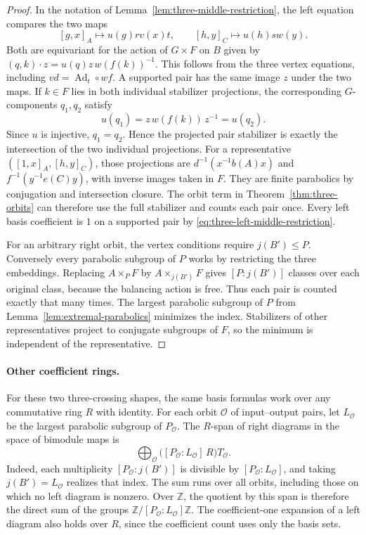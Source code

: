\documentclass[11pt,a4paper]{article}
\numberwithin{equation}{section}
\theoremstyle{definition}
\begin{document}
\begin{proof}
In the notation of Lemma~\ref{lem:three-middle-restriction}, the
left equation compares the two maps
\[
 [g,x]_A\longmapsto u(g)r v(x)t,\qquad
 [h,y]_C\longmapsto u(h)s w(y).
\]
Both are equivariant for the action of \(G\times F\) on \(B\)
given by \((q,k)\cdot z=u(q)z\,w(f(k))^{-1}\). This follows from
the three vertex equations, including
\(vd=\operatorname{Ad}_t\circ wf\).
A supported pair has the same image \(z\) under the two maps.
If \(k\in F\) lies in both individual stabilizer projections,
the corresponding \(G\)-components \(q_1,q_2\) satisfy
\[
 u(q_1)=z\,w(f(k))\,z^{-1}=u(q_2).
\]
Since \(u\) is injective, \(q_1=q_2\). Hence the projected pair
stabilizer is exactly the intersection of the two individual
projections. For a representative \(([1,x]_A,[h,y]_C)\), those
projections are \(d^{-1}(x^{-1}b(A)x)\) and
\(f^{-1}(y^{-1}e(C)y)\), with inverse images taken in \(F\).
They are finite parabolics by conjugation and intersection
closure. The orbit term in Theorem~\ref{thm:three-orbits} can
therefore use the full stabilizer and counts each pair once.
Every left basis coefficient is \(1\) on a supported pair by
\eqref{eq:three-left-middle-restriction}.

For an arbitrary right orbit, the vertex conditions require
\(j(B')\le P\). Conversely every parabolic subgroup of \(P\)
works by restricting the three embeddings. Replacing
\(A\times_P F\) by \(A\times_{j(B')}F\) gives
\([P:j(B')]\) classes over each original class, because the
balancing action is free. Thus each pair is counted exactly
that many times. The largest parabolic subgroup of \(P\) from
Lemma~\ref{lem:extremal-parabolics} minimizes the index. Stabilizers of other representatives
project to conjugate subgroups of \(F\), so the minimum is
independent of the representative.
\end{proof}

\paragraph{Other coefficient rings.}
For these two three-crossing shapes, the same basis formulas work
over any commutative ring \(R\) with identity. For each orbit
\(\mathcal O\) of input--output pairs, let \(L_{\mathcal O}\) be the
largest parabolic subgroup of \(P_{\mathcal O}\). The \(R\)-span of
right diagrams in the space of bimodule maps is
\[
 \bigoplus_{\mathcal O}
    \bigl([P_{\mathcal O}:L_{\mathcal O}]\,R\bigr)T_{\mathcal O}.
\]
Indeed, each multiplicity \([P_{\mathcal O}:j(B')]\) is divisible
by \([P_{\mathcal O}:L_{\mathcal O}]\), and taking
\(j(B')=L_{\mathcal O}\) realizes that index. The sum runs over all
orbits, including those on which no left diagram is nonzero. Over
\(\mathbb Z\), the quotient by this span is therefore the direct
sum of the groups \(\mathbb Z/[P_{\mathcal O}:L_{\mathcal O}]\mathbb Z\).
The coefficient-one expansion of a left diagram also holds over
\(R\), since the coefficient count uses only the basis sets.
\end{document}
